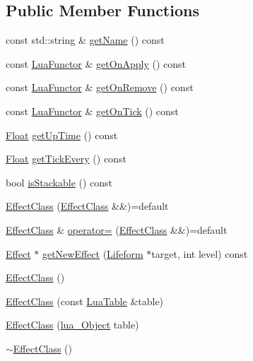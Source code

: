\subsection*{Public Member Functions}
\begin{DoxyCompactItemize}
\item 
const std\+::string \& \hyperlink{classZeta_1_1EffectClass_acffab078eec3b03e011dc92af17a8eb5}{get\+Name} () const 
\item 
const \hyperlink{classZeta_1_1LuaFunctor}{Lua\+Functor} \& \hyperlink{classZeta_1_1EffectClass_ae7619cf0ddbb7b07693afeb354014406}{get\+On\+Apply} () const 
\item 
const \hyperlink{classZeta_1_1LuaFunctor}{Lua\+Functor} \& \hyperlink{classZeta_1_1EffectClass_a068f166b6405eb77660f19358a7432fb}{get\+On\+Remove} () const 
\item 
const \hyperlink{classZeta_1_1LuaFunctor}{Lua\+Functor} \& \hyperlink{classZeta_1_1EffectClass_ab4a4c2b602cb09e5fbee4234dca45b82}{get\+On\+Tick} () const 
\item 
\hyperlink{namespaceZeta_a1e0a1265f9b3bd3075fb0fabd39088ba}{Float} \hyperlink{classZeta_1_1EffectClass_ab695b1de8727f2f50f5fc1f94e601837}{get\+Up\+Time} () const 
\item 
\hyperlink{namespaceZeta_a1e0a1265f9b3bd3075fb0fabd39088ba}{Float} \hyperlink{classZeta_1_1EffectClass_a8d3047afe4c901842e4387850ef1dcbf}{get\+Tick\+Every} () const 
\item 
bool \hyperlink{classZeta_1_1EffectClass_afaa59f5fa4fcd560a2cf3926e67e2409}{is\+Stackable} () const 
\item 
\hyperlink{classZeta_1_1EffectClass_ab3d5f3cb9038ce002b47027e36e73be7}{Effect\+Class} (\hyperlink{classZeta_1_1EffectClass}{Effect\+Class} \&\&)=default
\item 
\hyperlink{classZeta_1_1EffectClass}{Effect\+Class} \& \hyperlink{classZeta_1_1EffectClass_a2558ee0901b026deb54f7a30ef292ca0}{operator=} (\hyperlink{classZeta_1_1EffectClass}{Effect\+Class} \&\&)=default
\item 
\hyperlink{classZeta_1_1Effect}{Effect} $\ast$ \hyperlink{classZeta_1_1EffectClass_aa7fa8227db2da62bb69e17ceaeaa414c}{get\+New\+Effect} (\hyperlink{classZeta_1_1Lifeform}{Lifeform} $\ast$target, int level) const 
\item 
\hyperlink{classZeta_1_1EffectClass_a1d54a009b82f0835d4d9917f7a48b632}{Effect\+Class} ()
\item 
\hyperlink{classZeta_1_1EffectClass_a5d25ef586862dcb0ab29707fae914716}{Effect\+Class} (const \hyperlink{classZeta_1_1LuaTable}{Lua\+Table} \&table)
\item 
\hyperlink{classZeta_1_1EffectClass_a9c28c66f6159856bd31e3b75580648aa}{Effect\+Class} (\hyperlink{ZetaConfig_8hpp_ae7be32b73848041a60f2412f72bbb221}{lua\+\_\+\+Object} table)
\item 
\hyperlink{classZeta_1_1EffectClass_ac6c4386d9e57983ee3f2e6bc66f8c50f}{$\sim$\+Effect\+Class} ()
\end{DoxyCompactItemize}
